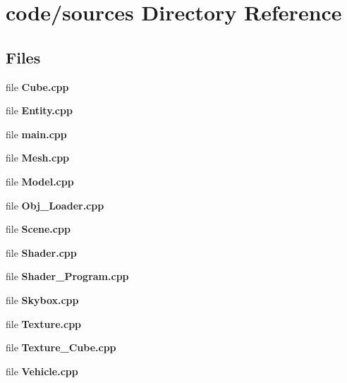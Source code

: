 \section{code/sources Directory Reference}
\label{dir_13c749f45d16b3d34e0b3be691e3a24c}
\subsection*{Files}
\begin{DoxyCompactItemize}
\item 
file \textbf{ Cube.\+cpp}
\item 
file \textbf{ Entity.\+cpp}
\item 
file \textbf{ main.\+cpp}
\item 
file \textbf{ Mesh.\+cpp}
\item 
file \textbf{ Model.\+cpp}
\item 
file \textbf{ Obj\+\_\+\+Loader.\+cpp}
\item 
file \textbf{ Scene.\+cpp}
\item 
file \textbf{ Shader.\+cpp}
\item 
file \textbf{ Shader\+\_\+\+Program.\+cpp}
\item 
file \textbf{ Skybox.\+cpp}
\item 
file \textbf{ Texture.\+cpp}
\item 
file \textbf{ Texture\+\_\+\+Cube.\+cpp}
\item 
file \textbf{ Vehicle.\+cpp}
\end{DoxyCompactItemize}
